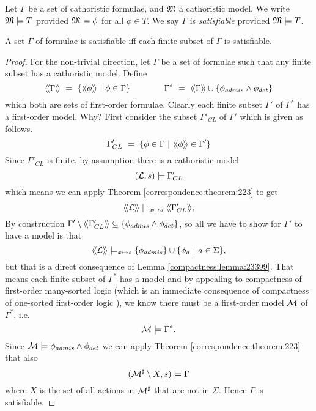 \begin{definition}
Let $\Gamma$ be a set of cathoristic formulae, and $\frak{M}$ a cathoristic model.  We
write $\frak{M} \models T$ provided $\frak{M} \models \phi$ for all $\phi \in
T$.  We say $\Gamma$ is \emph{satisfiable} provided $\frak{M} \models T$.
\end{definition}

\begin{theorem}
A set $\Gamma$ of \cathoristic{} formulae is satisfiable iff each finite subset of
$\Gamma$ is satisfiable.
\end{theorem}
\begin{proof}
For the non-trivial direction, let $\Gamma$ be a set of \cathoristic{} formulae
such that any finite subset has a cathoristic model. Define 
\[
  \SEMBTWO{\Gamma} 
     \ =\ 
  \{\SEMBTWO{\phi}\ |\ \phi \in \Gamma\} 
     \qquad\qquad
  \Gamma^*
     \ =\ 
  \SEMBTWO{\Gamma} \cup \{\phi_{admis} \AND  \phi_{det}\}
\]
which both are sets of first-order formulae. Clearly each finite subset $\Gamma'$ of 
$\Gamma^*$ has a first-order model. Why? First consider the subset $\Gamma'_{CL}$ of $\Gamma'$
which is given as follows.
\[
   \Gamma'_{CL} \ =\ \{ \phi \in \Gamma\ |\ \SEMBTWO{\phi} \in \Gamma' \}
\]
Since $\Gamma'_{CL}$ is finite, by assumption there is a cathoristic model 
\[
   (\mathcal{L}, s) \models \Gamma'_{CL}
\]
which means we can apply Theorem \ref{correspondence:theorem:223} to get
\[
   \langle\!\langle \mathcal{L} \rangle\!\rangle \models_{x \mapsto s} \langle\!\langle \Gamma'_{CL} \rangle\!\rangle,
\]
By construction $\Gamma' \setminus \langle\!\langle \Gamma'_{CL} \rangle\!\rangle \subseteq
\{\phi_{admis} \land \phi_{det}\}$, so all we have to
show for $\Gamma'$ to have a model is that
\[
    \langle\!\langle \mathcal{L} \rangle\!\rangle \models_{x \mapsto s} \{\phi_{admis}\} \cup \{ \phi_a\ |\ a \in \Sigma\},
\]
but that is a direct consequence of Lemma
\ref{compactness:lemma:23399}.  That
means each finite subset of $\Gamma^*$ has a model and by appealing to
compactness of first-order many-sorted logic (which is an immediate
consequence of compactness of one-sorted first-order logic
\cite{EndertonHB:matinttl}), we know there must be a first-order model
$\mathcal{M}$ of $\Gamma^*$, i.e.
\[
   \mathcal{M} \models \Gamma^*.
\]
Since $\mathcal{M} \models \phi_{admis} \land \phi_{det}$ we can apply
Theorem \ref{correspondence:theorem:223} that also
\[
   (\mathcal{M}^{\sharp} \setminus X, s) \models \Gamma
\]
where $X$ is the set of all actions in $\mathcal{M}^{\sharp}$ that are not
in $\Sigma$. Hence $\Gamma$ is satisfiable. 
\end{proof}





